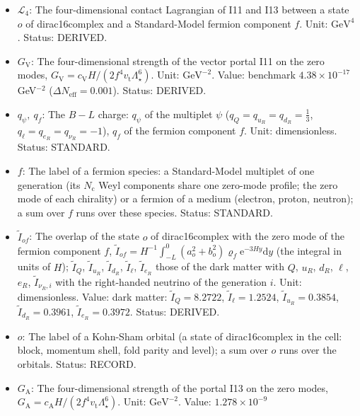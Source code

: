 \documentclass[
  10pt,
]{article}
\providecommand{\tightlist}{%
  \setlength{\itemsep}{0pt}\setlength{\parskip}{0pt}}
\begin{document}
\begin{itemize}
\tightlist
\item
  \(\mathcal{L}_4\): The four-dimensional contact Lagrangian of I11 and
  I13 between a state \(o\) of dirac16complex and a Standard-Model
  fermion component \(f\). Unit: \(\mathrm{GeV}^{4}\). Status: DERIVED.
\item
  \(G_{\mathrm{V}}\): The four-dimensional strength of the vector portal
  I11 on the zero modes,
  \(G_{\mathrm{V}} = c_{\mathrm{V}}H/(2f^4v_{\mathrm{t}}\Lambda_\star^6)\).
  Unit: \(\mathrm{GeV}^{-2}\). Value: benchmark \(4.38\times10^{-17}\)
  GeV\(^{-2}\) (\(\Delta N_{\mathrm{eff}} = 0.001\)). Status: DERIVED.
\item
  \(q_\psi,\ q_f\): The \(B - L\) charge: \(q_\psi\) of the multiplet
  \(\psi\) (\(q_Q = q_{u_R} = q_{d_R} = \frac13\),
  \(q_\ell = q_{e_R} = q_{\nu_R} = -1\)), \(q_f\) of the fermion
  component \(f\). Unit: dimensionless. Status: STANDARD.
\item
  \(f\): The label of a fermion species: a Standard-Model multiplet of
  one generation (its \(N_{\mathrm{c}}\) Weyl components share one
  zero-mode profile; the zero mode of each chirality) or a fermion of a
  medium (electron, proton, neutron); a sum over \(f\) runs over these
  species. Status: STANDARD.
\item
  \(\tilde I_{of}\): The overlap of the state \(o\) of dirac16complex
  with the zero mode of the fermion component \(f\),
  \(\tilde I_{of} = H^{-1}\int_{-L}^{0}(a_o^2 + b_o^2)\varrho_f\mathrm{e}^{-3Hy}\mathrm{d}y\)
  (the integral in units of \(H\)); \(\tilde I_Q\), \(\tilde I_{u_R}\),
  \(\tilde I_{d_R}\), \(\tilde I_\ell\), \(\tilde I_{e_R}\) those of the
  dark matter with \(Q\), \(u_R\), \(d_R\), \(\ell\), \(e_R\),
  \(\tilde I_{\nu_R,i}\) with the right-handed neutrino of the
  generation \(i\). Unit: dimensionless. Value: dark matter:
  \(\tilde I_Q = 8.2722\), \(\tilde I_\ell = 1.2524\),
  \(\tilde I_{u_R} = 0.3854\), \(\tilde I_{d_R} = 0.3961\),
  \(\tilde I_{e_R} = 0.3972\). Status: DERIVED.
\item
  \(o\): The label of a Kohn-Sham orbital (a state of dirac16complex in
  the cell: block, momentum shell, fold parity and level); a sum over
  \(o\) runs over the orbitals. Status: RECORD.
\item
  \(G_{\mathrm{A}}\): The four-dimensional strength of the portal I13 on
  the zero modes,
  \(G_{\mathrm{A}} = c_{\mathrm{A}}H/(2f^4v_{\mathrm{t}}\Lambda_\star^6)\).
  Unit: \(\mathrm{GeV}^{-2}\). Value: \(1.278\times10^{-9}\)

\end{itemize}
\end{document}
